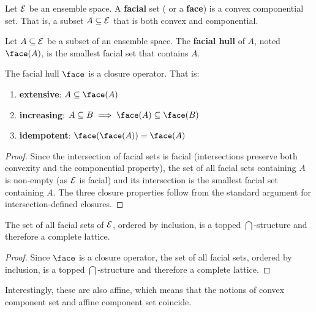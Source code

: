 \begin{mathSection}
	\begin{defn}
		Let $\mathcal{E}$ be an ensemble space. A \textbf{facial} set ( or a \textbf{face}) is a convex componential set. That is, a subset $A \subseteq \mathcal{E}$ that is both convex and componential.
	\end{defn}
	
	\begin{defn}
		Let $A \subseteq \mathcal{E}$ be a subset of an ensemble space. The \textbf{facial hull} of $A$, noted $\face(A)$, is the smallest facial set that contains $A$.
	\end{defn}
	
	\begin{prop}
		The facial hull $\face$ is a closure operator. That is:
		\begin{enumerate}
			\item \textbf{extensive}: $A \subseteq \face(A)$
			\item \textbf{increasing}: $A \subseteq B \implies \face(A) \subseteq \face(B)$
			\item \textbf{idempotent}: $\face(\face(A)) = \face(A)$
		\end{enumerate}
	\end{prop}
	
	\begin{proof}
		Since the intersection of facial sets is facial (intersections preserve both convexity and the componential property), the set of all facial sets containing $A$ is non-empty (as $\mathcal{E}$ is facial) and its intersection is the smallest facial set containing $A$. The three closure properties follow from the standard argument for intersection-defined closures.
	\end{proof}
	
	\begin{prop}
		The set of all facial sets of $\mathcal{E}$, ordered by inclusion, is a topped $\bigcap$-structure and therefore a complete lattice.
	\end{prop}
	
	\begin{proof}
		Since $\face$ is a closure operator, the set of all facial sets, ordered by inclusion, is a topped $\bigcap$-structure and therefore a complete lattice.
	\end{proof}
	
\end{mathSection}

 Interestingly, these are also affine, which means that the notions of convex component set and affine component set coincide.

